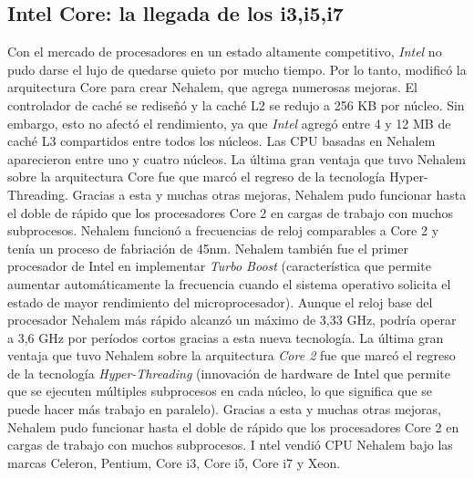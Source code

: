 \subsection{Intel Core: la llegada de los i3,i5,i7}
Con el mercado de procesadores en un estado altamente competitivo, \emph{Intel} no pudo darse el lujo de quedarse quieto por mucho tiempo. 
Por lo tanto, modificó la arquitectura Core para crear Nehalem, que agrega numerosas mejoras. El controlador de caché se rediseñó y 
la caché L2 se redujo a 256 KB por núcleo. Sin embargo, esto no afectó el rendimiento, ya que \emph{Intel} agregó entre 4 y 12 MB de caché L3 
compartidos entre todos los núcleos. Las CPU basadas en Nehalem aparecieron entre uno y cuatro núcleos. La última gran 
ventaja que tuvo Nehalem sobre la arquitectura Core fue que marcó el regreso de la tecnología Hyper-Threading. Gracias a esta y 
muchas otras mejoras, Nehalem pudo funcionar hasta el doble de rápido que los procesadores Core 2 en cargas de trabajo con muchos 
subprocesos. Nehalem funcionó a frecuencias de reloj comparables a Core 2 y tenía un proceso de fabriación de 45nm. 
Nehalem también fue el primer procesador de Intel en implementar \emph{Turbo Boost} (característica que permite aumentar automáticamente la frecuencia 
cuando el sistema operativo solicita el estado de mayor rendimiento del microprocesador). Aunque el reloj base del procesador Nehalem más rápido 
alcanzó un máximo de 3,33 GHz, podría operar a 3,6 GHz por períodos cortos gracias a esta nueva tecnología. La última gran ventaja que tuvo 
Nehalem sobre la arquitectura \emph{Core 2} fue que marcó el regreso de la tecnología \emph{Hyper-Threading}
(innovación de hardware de Intel que permite que se ejecuten múltiples subprocesos en cada núcleo, lo que significa que se puede hacer más trabajo en paralelo). 
Gracias a esta y muchas otras mejoras, Nehalem pudo funcionar hasta el doble de rápido que los procesadores Core 2 en cargas de trabajo con muchos subprocesos. I
ntel vendió CPU Nehalem bajo las marcas Celeron, Pentium, Core i3, Core i5, Core i7 y Xeon.

